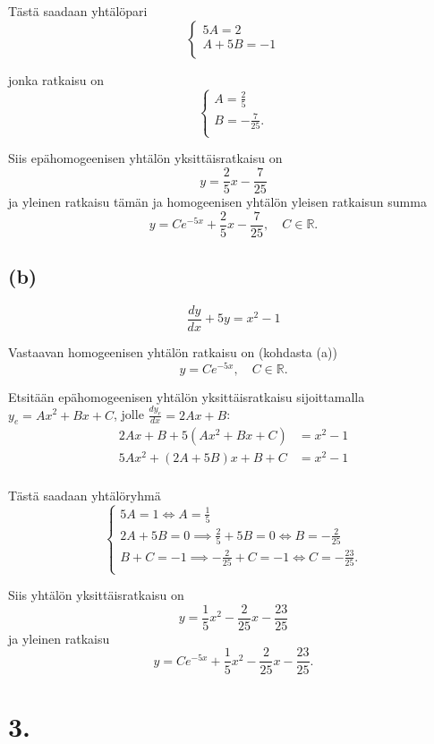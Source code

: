 \documentclass{article}
\begin{document}
Tästä saadaan yhtälöpari
\[
  \begin{cases}
    5A = 2 \\
    A + 5B = -1 \\
  \end{cases}
\]

jonka ratkaisu on
\[
  \begin{cases}
    A = \frac{2}{5} \\
    B = -\frac{7}{25}. \\
  \end{cases}
\]

Siis epähomogeenisen yhtälön yksittäisratkaisu on
\[
  y = \frac{2}{5}x - \frac{7}{25}
\]
ja yleinen ratkaisu tämän ja homogeenisen yhtälön yleisen ratkaisun summa
\[
  y = Ce^{-5x} + \frac{2}{5}x - \frac{7}{25}, \quad C \in \mathbb{R}.
\]

\subsection*{(b)}

\[
  \frac{dy}{dx} + 5y = x^2 - 1
\]

Vastaavan homogeenisen yhtälön ratkaisu on (kohdasta (a))
\[
  y = Ce^{-5x}, \quad C \in \mathbb{R}.
\]

Etsitään epähomogeenisen yhtälön yksittäisratkaisu sijoittamalla
$y_e = Ax^2 + Bx + C$, jolle $\frac{dy_e}{dx} = 2Ax + B$:
\begin{align*}
  2Ax + B + 5(Ax^2 + Bx + C) &= x^2 - 1 \\
  5Ax^2 + (2A + 5B)x + B + C &= x^2 - 1 \\
\end{align*}

Tästä saadaan yhtälöryhmä
\[
  \begin{cases}
    5A = 1 \iff A = \frac{1}{5} \\
    2A + 5B = 0 \implies \frac{2}{5} + 5B = 0 \iff B = -\frac{2}{25} \\
    B + C = -1 \implies -\frac{2}{25} + C = -1 \iff C = -\frac{23}{25}. \\
  \end{cases}
\]

Siis yhtälön yksittäisratkaisu on
\[
  y = \frac{1}{5}x^2 - \frac{2}{25}x - \frac{23}{25}
\]
ja yleinen ratkaisu
\[
  y = Ce^{-5x} + \frac{1}{5}x^2 - \frac{2}{25}x - \frac{23}{25}.
\]

\section*{3.}
\end{document}
